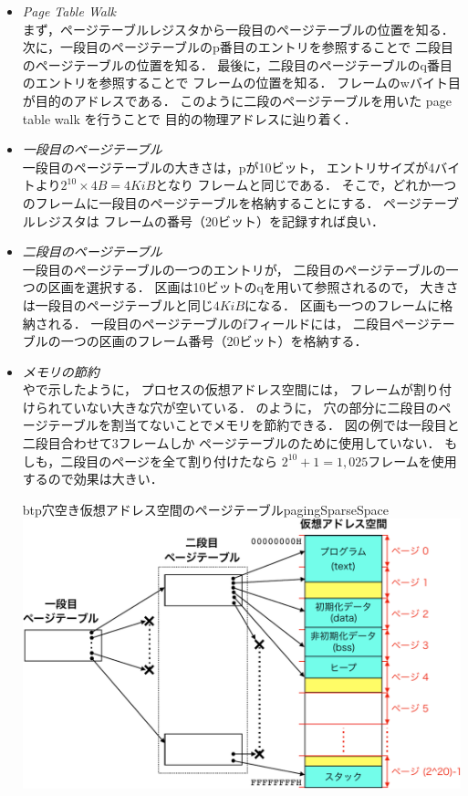 \begin{itemize}
\item \emph{Page Table Walk} \\
  まず，ページテーブルレジスタから一段目のページテーブルの位置を知る．
  次に，一段目のページテーブルのp番目のエントリを参照することで
  二段目のページテーブルの位置を知る．
  最後に，二段目のページテーブルのq番目のエントリを参照することで
  フレームの位置を知る．
  フレームのwバイト目が目的のアドレスである．
  このように二段のページテーブルを用いた page table walk を行うことで
  目的の物理アドレスに辿り着く．
\item \emph{一段目のページテーブル} \\
  一段目のページテーブルの大きさは，pが10ビット，
  エントリサイズが4バイトより$2^{10} \times 4B =4KiB$となり
  フレームと同じである．
  そこで，どれか一つのフレームに一段目のページテーブルを格納することにする．
  ページテーブルレジスタは
  フレームの番号（20ビット）を記録すれば良い．
\item \emph{二段目のページテーブル} \\
  一段目のページテーブルの一つのエントリが，
  二段目のページテーブルの一つの区画を選択する．
  区画は10ビットのqを用いて参照されるので，
  大きさは一段目のページテーブルと同じ$4KiB$になる．
  区画も一つのフレームに格納される．
  一段目のページテーブルのfフィールドには，
  二段目ページテーブルの一つの区画のフレーム番号（20ビット）を格納する．
\item \emph{メモリの節約}\\
  やで示したように，
  プロセスの仮想アドレス空間には，
  フレームが割り付けられていない大きな穴が空いている．
  のように，
  穴の部分に二段目のページテーブルを割当てないことでメモリを節約できる．
  図の例では一段目と二段目合わせて3フレームしか
  ページテーブルのために使用していない．
  もしも，二段目のページを全て割り付けたなら
  $2^{10}+1=1,025$フレームを使用するので効果は大きい．
  \begin{myfig}{btp}{穴空き仮想アドレス空間のページテーブル}{pagingSparseSpace}
    \includegraphics[scale=0.66]{Fig/pagingSparseSpace-crop.pdf}
  \end{myfig}
\end{itemize}

